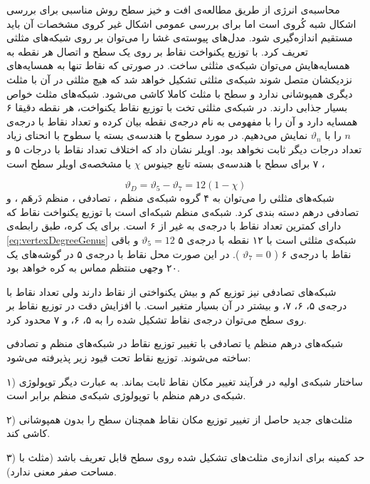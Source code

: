 محاسبه‌ی انرژی از طریق مطالعه‌ی افت و خیز سطح روش مناسبی برای بررسی اشکال شبه کُروی است اما برای بررسی عمومی اشکال غیر کروی مشخصات آن باید مستقیم اندازه‌گیری شود. مدل‌های پیوسته‌ی غشا را می‌توان بر روی شبکه‌های مثلثی تعریف کرد. با توزیع یکنواخت نقاط بر روی یک سطح و اتصال هر نقطه  به همسایه‌هایش می‌توان شبکه‌ی مثلثی ساخت. در صورتی که نقاط تنها به همسایه‌های نزدیکشان متصل شوند شبکه‌ی مثلثی تشکیل خواهد شد که هیچ مثلثی در آن با مثلث دیگری همپوشانی ندارد و سطح با مثلث کاملا کاشی می‌شود. شبکه‌های مثلث خواص بسیار جذابی دارند. در شبکه‌‌ی مثلثی تخت با توزیع نقاط یکنواخت، هر نقطه دقیقا ۶ همسایه دارد و آن را با مفهومی به نام درجه‌ی نقطه
بیان کرده و تعداد نقاط با درجه‌ی 
$n$
را با 
$\vartheta_n$
نمایش می‌دهیم. در مورد سطوح با هندسه‌ی بسته یا سطوح با انحنای زیاد تعداد درجات دیگر ثابت نخواهد بود. اویلر نشان داد که اختلاف تعداد  نقاط با درجات ۵ و ۷ برای سطح با هندسه‌ی بسته تابع جینوس
$\chi$
یا مشخصه‌ی اویلر سطح است
\cite{Nguyen2005PRE}
،


\begin{equation}
\vartheta_D=\vartheta_5-\vartheta_7=12(1-\chi)
\label{eq:vertexDegreeGenus}
\end{equation}
شبکه‌های مثلثی را می‌توان به ۴ گروه شبکه‌ی منظم
، تصادفی
، منظم دَرهَم
، و تصادفی درهم
دسته بندی کرد. شبکه‌ی منظم شبکه‌ای است با توزیع یکنواخت نقاط که دارای کمترین تعداد نقاط با درجه‌ی به غیر از ۶ است. برای یک کره، طبق رابطه‌ی 
\ref{eq:vertexDegreeGenus}
شبکه‌ی مثلثی است با ۱۲ نقطه با درجه‌ی ۵
$\vartheta_5=12$
و باقی نقاط با درجه‌ی ۶ (
$\vartheta_7=0$
). در این صورت محل نقاط با درجه‌ی ۵ در گوشه‌های یک ۲۰ وجهی منتظم
 مماس به کره خواهد بود.
 
 شبکه‌های تصادفی نیز توزیع کم و بیش یکنواختی از نقاط دارند ولی تعداد نقاط با درجه‌ی ۵، ۶، ۷،  و بیشتر در آن بسیار متغیر است. با افزایش دقت در توزیع نقاط بر روی سطح می‌توان درجه‌ی نقاط تشکیل شده را به ۵، ۶، و ۷ محدود کرد. 
 
شبکه‌های درهم منظم یا تصادفی با تغییر توزیع نقاط در شبکه‌های منظم و تصادفی ساخته می‌شوند. توزیع نقاط تحت قیود زیر  پذیرفته می‌شود:

۱) ساختار شبکه‌ی اولیه در فرآیند تغییر مکان نقاط ثابت بماند. به عبارت دیگر توپولوژی شبکه‌ی درهم منظم با توپولوژی شبکه‌ی منظم برابر است.

۲) مثلث‌های جدید حاصل از تغییر توزیع مکان نقاط همچنان سطح را بدون همپوشانی کاشی کند.

۳) حد کمینه برای اندازه‌ی مثلث‌های تشکیل شده روی سطح قابل تعریف باشد (مثلث با مساحت صفر معنی ندارد).
